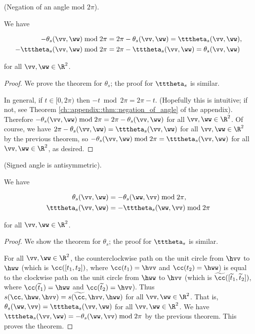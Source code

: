 \begin{theorem}
\label{ch::lin_alg::thm::negation_of_angle}
    (Negation of an angle $\text{mod } 2\pi$).

    We have 

    \begin{align*}
        -\theta_s(\vv, \ww) \bmod 2\pi &= 2\pi - \theta_s(\vv, \ww) = \tttheta_s(\vv, \ww), \\
        -\tttheta_s(\vv, \ww) \bmod 2\pi &= 2\pi - \tttheta_s(\vv, \ww) = \theta_s(\vv, \ww)
    \end{align*}

    for all $\vv, \ww \in \R^2$.
\end{theorem}

\begin{proof}
    We prove the theorem for $\theta_s$; the proof for $\tttheta_s$ is similar.
    
    In general, if $t \in [0, 2\pi)$ then $-t \bmod 2\pi = 2\pi - t$. (Hopefully this is intuitive; if not, see Theorem \ref{ch::appendix::thm::negation_of_angle} of the appendix). Therefore $-\theta_s(\vv, \ww) \bmod 2\pi = 2\pi - \theta_s(\vv, \ww)$ for all $\vv, \ww \in \R^2$. Of course, we have $2\pi - \theta_s(\vv, \ww) = \tttheta_s(\vv, \ww)$ for all $\vv, \ww \in \R^2$ by the previous theorem, so $-\theta_s(\vv, \ww) \bmod 2\pi = \tttheta_s(\vv, \ww)$ for all $\vv, \ww \in \R^2$, as desired.
\end{proof}

\begin{theorem}
    (Signed angle is antisymmetric).
    
    We have 
    
    \begin{align*}
        \theta_s(\vv, \ww) &= -\theta_s(\ww, \vv) \bmod 2\pi, \\
        \tttheta_s(\vv, \ww) &= -\tttheta_s(\ww, \vv) \bmod 2\pi
    \end{align*}

    for all $\vv, \ww \in \R^2$.
\end{theorem}

\begin{proof}
    We show the theorem for $\theta_s$; the proof for $\tttheta_s$ is similar.

    For all $\vv, \ww \in \R^2$, the counterclockwise path on the unit circle from $\hvv$ to $\hww$ (which is $\cc([t_1, t_2])$, where $\cc(t_1) = \hvv$ and $\cc(t_2) = \hww$) is equal to the clockwise path on the unit circle from $\hww$ to $\hvv$ (which is $\widetilde{\cc}([\widetilde{t}_1, \widetilde{t}_2])$, where $\cc(\widetilde{t}_1) = \hww$ and $\cc(\widetilde{t}_2) = \hvv$). Thus $s(\cc, \hww, \hvv) = s(\widetilde{\cc}, \hvv, \hww)$ for all $\vv, \ww \in \R^2$. That is, $\theta_s(\ww, \vv) = \tttheta_s(\vv, \ww)$ for all $\vv, \ww \in \R^2$. We have $\tttheta_s(\vv, \ww) = -\theta_s(\ww, \vv) \bmod 2\pi$ by the previous theorem. This proves the theorem.
\end{proof}

